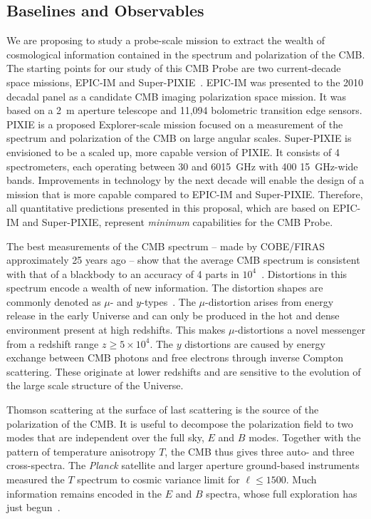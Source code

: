 
\subsection{Baselines and Observables}
\label{sec:observables}

\vspace{-0.05in}

We are proposing to study a probe-scale mission to extract the wealth 
of cosmological information contained in the spectrum and polarization of the \ac{CMB}. 
The starting points for our study of this CMB Probe are two current-decade space missions, 
EPIC-IM and Super-PIXIE~\cite{bock2009, Kogut2011PIXIE}. EPIC-IM was presented 
to the 2010 decadal panel as a candidate \ac{CMB} imaging polarization space mission. 
It was based on a 2~m aperture telescope and 11,094 bolometric transition edge sensors. 
PIXIE is a proposed Explorer-scale mission focused on a measurement of the spectrum 
and polarization of the CMB on large angular scales. Super-PIXIE is envisioned to be a scaled up, 
more capable version of PIXIE. It consists of 4 spectrometers, each operating between 
30 and 6015~GHz with 400 15~GHz-wide bands. Improvements in technology by the next decade will enable 
the design of a mission that is more capable compared to EPIC-IM and Super-PIXIE. Therefore, all 
quantitative predictions presented in this proposal, which are based on EPIC-IM and Super-PIXIE, 
represent {\it minimum} capabilities for the CMB Probe. 

The best measurements of the \ac{CMB} spectrum -- made by COBE/FIRAS approximately 25 years ago --
show that the average CMB spectrum is consistent with that of a blackbody to an accuracy of 4 parts 
in $10^{4}$~\cite{Mather1994, Fixsen1996}. Distortions in this spectrum encode a wealth of new information.
The distortion shapes are commonly denoted as $\mu$- and $y$-types~\cite{Zeldovich1969, Sunyaev1970mu}. The 
$\mu$-distortion arises from energy release in the early Universe and can only be produced in the hot and dense 
environment present at high redshifts. This makes $\mu$-distortions a novel messenger from a redshift 
range $ z \geq 5\times10^{4} $. The $y$ distortions are caused by 
energy exchange between \ac{CMB} photons and free electrons through inverse Compton 
scattering. These originate at lower redshifts and are sensitive to the 
evolution of the large scale structure of the Universe. 

Thomson scattering at the surface of last scattering is the source of the polarization of the \ac{CMB}. It is useful 
to decompose the polarization field to two modes that are independent over the full sky, $E$ and $B$ modes. 
Together with the pattern of temperature anisotropy $T$, the \ac{CMB} thus gives three auto- and three cross-spectra. 
The {\it Planck} satellite and larger aperture ground-based instruments measured the $T$ spectrum to cosmic
variance limit for $\ell \leq 1500$. Much information remains encoded in the $E$ and $B$ spectra, whose full exploration 
has just begun~\cite{planck,spt,polarbear,bicep}.   


